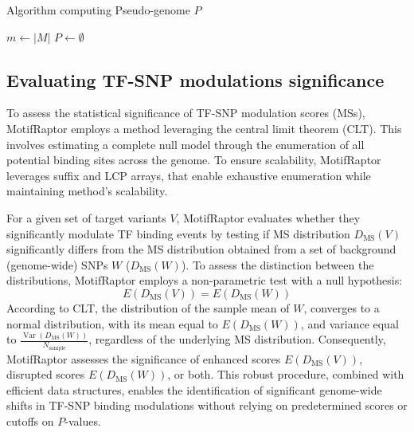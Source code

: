 \documentclass[a4paper, titlepage, openright]{book}
\DeclareMathOperator*{\Var}{Var}
\newcommand{\motifraptor}{MotifRaptor\xspace}
\begin{document}
\begin{algorithm}[!]
    \caption{Algorithm computing Pseudo-genome $P$}
    \label{alg:motifraptor-pseudogenome}
    $m \gets |M|$\;
    $P \gets \emptyset$\;
\end{algorithm}

\subsection{Evaluating TF-SNP modulations significance}
To assess the statistical significance of TF-SNP modulation scores (MSs), \motifraptor employs a method leveraging the central limit theorem (CLT). This involves estimating a complete null model through the enumeration of all potential binding sites across the genome. To ensure scalability, \motifraptor leverages suffix and LCP arrays, that enable exhaustive enumeration while maintaining method's scalability.

For a given set of target variants $V$, \motifraptor evaluates whether they significantly modulate TF binding events by testing if MS distribution $D_{\text{MS}}(V)$ significantly differs from the MS distribution obtained from a set of background (genome-wide) SNPs $W$ ($D_{\text{MS}}(W)$). To assess the distinction between the distributions, \motifraptor employs a non-parametric test with a null hypothesis: 
\[
    E(D_{\text{MS}}(V))=E(D_{\text{MS}}(W))
\]
According to CLT, the distribution of the sample mean of $W$, converges to a normal distribution, with its mean equal to $E(D_{\text{MS}}(W))$, and variance equal to $\frac{\Var({D_{\text{MS}}(W)})}{N_{\text{sample}}}$, regardless of the underlying MS distribution. Consequently, \motifraptor assesses the significance of enhanced scores $E(D_{\text{MS}}(V))$, disrupted scores $E(D_{\text{MS}}(W))$, or both. This robust procedure, combined with efficient data structures, enables the identification of significant genome-wide shifts in TF-SNP binding modulations without relying on predetermined scores or cutoffs on $P$-values.
\end{document}
